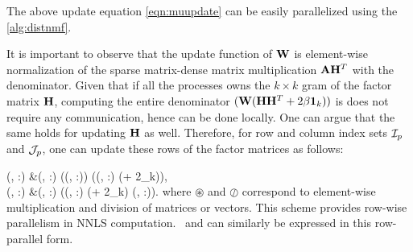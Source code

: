 The above update equation \cref{eqn:muupdate} can be easily parallelized using the \cref{alg:distnmf}. 


It is important to observe that the update function of $\mathbf{W}$ is element-wise normalization of the sparse matrix-dense matrix multiplication $\mathbf{A} \mathbf{H}^T$ with the denominator. Given that if all the processes owns the $k \times k$ gram of the factor matrix $\mathbf{H}$, computing the entire denominator $(\mathbf{W} (\mathbf{H} \mathbf{H}^T+ 2\beta \mathbf{1}_k))$ is does not require any communication, hence can be done locally.
One can argue that the same holds for updating $\mathbf{H}$ as well.
Therefore, for row and column index sets $\mathcal{I}_p$ and $\mathcal{J}_p$, one can update these rows of the factor matrices as follows:

\SplitN{\label{eqn:muupdate}} {
\Wm(\Ip, :) &\leftarrow \Wm(\Ip, :) \circledast (\Wmt(\Ip, :)) \oslash (\Wm(\Ip, :) (\Hmgr+ 2\beta {}_k)), \\
\Hm(\Jp, :) &\leftarrow  \Hm(\Jp, :) \circledast (\Hmt(\Jp, :) \oslash (\Wmgr+ 2\alpha{}_k) \Hm(\Jp, :)).
}
where $\circledast$ and $\oslash$ correspond to element-wise multiplication and division of matrices or vectors.
This scheme provides row-wise parallelism in NNLS computation.
\HALS\ and \BPP can similarly be expressed in this row-parallel form.


